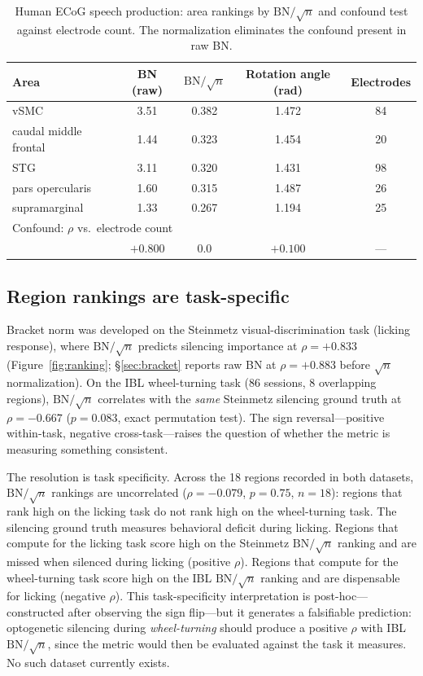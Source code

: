 \documentclass[9pt,lineno]{elife}
\begin{document}
\begin{table}[t]
\centering
\caption{Human ECoG speech production: area rankings by $\text{BN}/\!\sqrt{n}$ and confound test against electrode count. The normalization eliminates the confound present in raw BN.}
\label{tab:ecog}
\small
\begin{tabular}{lcccc}
\toprule
Area & BN (raw) & $\text{BN}/\!\sqrt{n}$ & Rotation angle (rad) & Electrodes \\
\midrule
vSMC & 3.51 & 0.382 & 1.472 & 84 \\
caudal middle frontal & 1.44 & 0.323 & 1.454 & 20 \\
STG & 3.11 & 0.320 & 1.431 & 98 \\
pars opercularis & 1.60 & 0.315 & 1.487 & 26 \\
supramarginal & 1.33 & 0.267 & 1.194 & 25 \\
\midrule
\multicolumn{5}{l}{Confound: $\rho$ vs.\ electrode count} \\
\midrule
 & $+0.800$ & $0.0$ & $+0.100$ & --- \\
\bottomrule
\end{tabular}
\end{table}

\subsection{Region rankings are task-specific}
\label{sec:scope}

Bracket norm was developed on the Steinmetz visual-discrimination task (licking response), where $\text{BN}/\!\sqrt{n}$ predicts silencing importance at $\rho = +0.833$ (Figure~\ref{fig:ranking}; \S\ref{sec:bracket} reports raw BN at $\rho = +0.883$ before $\sqrt{n}$ normalization). On the IBL wheel-turning task (86 sessions, 8 overlapping regions), $\text{BN}/\!\sqrt{n}$ correlates with the \emph{same} Steinmetz silencing ground truth at $\rho = -0.667$ ($p = 0.083$, exact permutation test). The sign reversal---positive within-task, negative cross-task---raises the question of whether the metric is measuring something consistent.

The resolution is task specificity. Across the 18 regions recorded in both datasets, $\text{BN}/\!\sqrt{n}$ rankings are uncorrelated ($\rho = -0.079$, $p = 0.75$, $n = 18$): regions that rank high on the licking task do not rank high on the wheel-turning task. The silencing ground truth measures behavioral deficit during licking. Regions that compute for the licking task score high on the Steinmetz $\text{BN}/\!\sqrt{n}$ ranking and are missed when silenced during licking (positive $\rho$). Regions that compute for the wheel-turning task score high on the IBL $\text{BN}/\!\sqrt{n}$ ranking and are dispensable for licking (negative $\rho$). This task-specificity interpretation is post-hoc---constructed after observing the sign flip---but it generates a falsifiable prediction: optogenetic silencing during \emph{wheel-turning} should produce a positive $\rho$ with IBL $\text{BN}/\!\sqrt{n}$, since the metric would then be evaluated against the task it measures. No such dataset currently exists.
\end{document}
